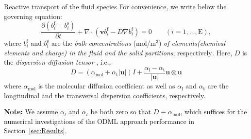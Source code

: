 \begin{frame}{Reactive transport of the fluid species}
	For convenience,
	we write below the governing equation:
	\begin{equation}
		\frac{\partial(b_{i}^{\text{f}}+b_{i}^{\text{s}})}{\partial t}+\nabla\cdot(\boldsymbol{v}b_{i}^{\text{f}}-D\nabla b_{i}^{\text{f}})=0\qquad(i=1,\ldots,\mathrm{E}),\label{eq:elemental-mass-conservation-equation}
	\end{equation}
	where $b_{i}^{\text{f}}$ and $b_{i}^{\text{s}}$ are the \emph{bulk
		concentrations }(mol/m$^{3}$)\emph{ of elements(chemical elements
		and charge) in the fluid and the solid partitions}, respectively\emph{.
	}Here, $D$ is the \emph{dispersion-diffusion tensor} \citep{Peaceman1977},
	i.e., 
	\begin{equation}
		D=(\alpha_{\mathrm{mol}}+\alpha_{\mathrm{t}}|\boldsymbol{u}|)I+\frac{\alpha_{\mathrm{l}}-\alpha_{\mathrm{t}}}{|\boldsymbol{u}|}\boldsymbol{u}\otimes\boldsymbol{u}\label{eq:dispersion-diffusion-tensor}
	\end{equation}
	where $\alpha_{\mathrm{mol}}$ is the molecular diffusion coefficient
	as well as $\alpha_{\mathrm{l}}$ and $\alpha_{\mathrm{t}}$ are the
	longitudinal and the transversal dispersion coefficients, respectively.
	
	\textbf{Note:} We assume $\alpha_{l}$ and $\alpha_{t}$ be both zero
	so that $D\equiv\alpha_{\mathrm{mol}}$, which suffices for the numerical
	investigations of the ODML approach performance in Section~\ref{sec:Results}.
	
\end{frame}

